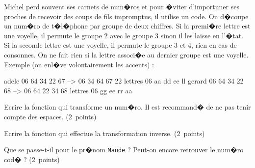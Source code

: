 \exosubject{}
\begin{xexercice}\label{td_note_label6_2016}%


\exequest Michel perd souvent ses carnets de num�ros et pour �viter d'importuner ses proches de recevoir des coups de fils impromptus, il utilise un code. On d�coupe un num�ro de t�l�phone par groupe de deux chiffres. Si la premi�re lettre est une voyelle, il permute le groupe 2 avec le groupe 3 sinon il les laisse en l'�tat. Si la seconde lettre est une voyelle, il permute le groupe 3 et 4, rien en cas de consonnes. On ne fait rien si la lettre associ�e au dernier groupe est une voyelle. Exemple (on enl�ve volontairement les accents) :

\begin{verbatimx}
adele   06 64 34 22 67 --> 06 34 64 67 22  lettres 06 aa dd ee ll  
gerard  06 64 34 22 68 --> 06 64 22 34 68  lettres 06 gg ee rr aa
\end{verbatimx}

Ecrire la fonction qui transforme un num�ro. Il est recommand� de ne pas tenir compte des espaces. (2~points)

\exequest Ecrire la fonction qui effectue la transformation inverse. (2~points)


\exequest Que se passe-t-il pour le pr�nom \texttt{Maude} ? Peut-on encore retrouver le num�ro cod� ? (2~points)


\end{xexercice}








%
